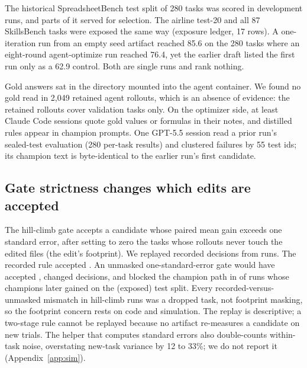 The historical SpreadsheetBench test split of 280 tasks was scored in development runs, and parts of it served for selection. The airline test-20 and all 87 SkillsBench tasks were exposed the same way (exposure ledger, 17 rows). A one-iteration run from an empty seed artifact reached 85.6 on the 280 tasks where an eight-round agent-optimize run reached 76.4, yet the earlier draft listed the first run only as a 62.9 control. Both are single runs and rank nothing.

Gold answers sat in the directory mounted into the agent container. We found no gold read in 2{,}049 retained agent rollouts, which is an absence of evidence: the retained rollouts cover validation tasks only. On the optimizer side, at least \goldOptimizerRuns{} Claude Code sessions quote gold values or formulas in their notes, and distilled rules appear in champion prompts. One GPT-5.5 session read a prior run's sealed-test evaluation (280 per-task results) and clustered failures by 55 test ids; its champion text is byte-identical to the earlier run's first candidate.

\subsection{Gate strictness changes which edits are accepted}

The hill-climb gate accepts a candidate whose paired mean gain exceeds one standard error, after setting to zero the tasks whose rollouts never touch the edited files (the edit's footprint). We replayed \replayDecisions{} recorded decisions from \replayRuns{} runs. The recorded rule accepted \replayRecorded{}. An unmasked one-standard-error gate would have accepted \replayUnmasked{}, changed \replayFlipsUnmasked{} decisions, and blocked the champion path in \replayBlockedRuns{} of \replayPathRuns{} runs whose champions later gained on the (exposed) test split. Every recorded-versus-unmasked mismatch in hill-climb runs was a dropped task, not footprint masking, so the footprint concern rests on code and simulation. The replay is descriptive; a two-stage rule cannot be replayed because no artifact re-measures a candidate on new trials. The helper that computes standard errors also double-counts within-task noise, overstating new-task variance by 12 to 33\%; we do not report it (Appendix~\ref{app:sim}).

